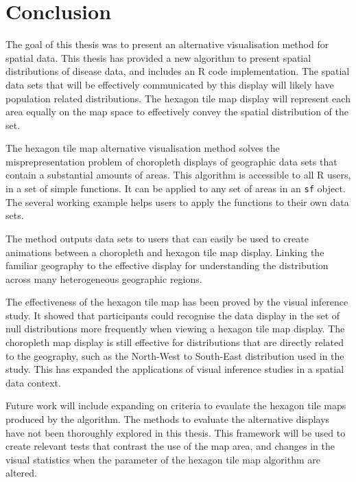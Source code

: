 \documentclass{monashthesis}
\begin{document}
\hypertarget{conclusion}{%
\chapter{Conclusion}\label{conclusion}}

The goal of this thesis was to present an alternative visualisation method for spatial data. This thesis has provided a new algorithm to present spatial distributions of disease data, and includes an R code \autocite{R} implementation. The spatial data sets that will be effectively communicated by this display will likely have population related distributions. The hexagon tile map display will represent each area equally on the map space to effectively convey the spatial distribution of the set.

The hexagon tile map alternative visualisation method solves the misprepresentation problem of choropleth displays of geographic data sets that contain a substantial amounts of areas. This algorithm is accessible to all R users, in a set of simple functions. It can be applied to any set of areas in an \texttt{sf} \autocite{sf} object. The several working example helps users to apply the functions to their own data sets.

The method outputs data sets to users that can easily be used to create animations between a choropleth and hexagon tile map display. Linking the familiar geography to the effective display for understanding the distribution across many heterogeneous geographic regions.

The effectiveness of the hexagon tile map has been proved by the visual inference study. It showed that participants could recognise the data display in the set of null distributions more frequently when viewing a hexagon tile map display. The choropleth map display is still effective for distributions that are directly related to the geography, such as the North-West to South-East distribution used in the study.
This has expanded the applications of visual inference studies in a spatial data context.

Future work will include expanding on criteria to evaulate the hexagon tile maps produced by the algorithm. The methods to evaluate the alternative displays have not been thoroughly explored in this thesis.
This framework will be used to create relevant tests that contrast the use of the map area, and changes in the visual statistics when the parameter of the hexagon tile map algorithm are altered.
\end{document}
